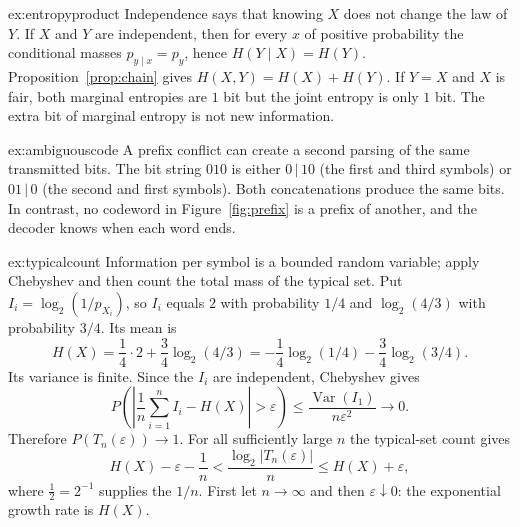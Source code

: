 \begin{solution}{ex:entropyproduct}
\idea Independence says that knowing $X$ does not change the law of $Y$.
\writeup If $X$ and $Y$ are independent, then for every $x$ of positive probability the conditional masses $p_{y\mid x}=p_y$, hence $H(Y\mid X)=H(Y)$. Proposition~\ref{prop:chain} gives $H(X,Y)=H(X)+H(Y)$. If $Y=X$ and $X$ is fair, both marginal entropies are $1$ bit but the joint entropy is only $1$ bit. The extra bit of marginal entropy is not new information.
\end{solution}

\begin{solution}{ex:ambiguouscode}
\idea A prefix conflict can create a second parsing of the same transmitted bits.
\writeup The bit string $010$ is either $0\,|\,10$ (the first and third symbols) or $01\,|\,0$ (the second and first symbols). Both concatenations produce the same bits. In contrast, no codeword in Figure~\ref{fig:prefix} is a prefix of another, and the decoder knows when each word ends.
\end{solution}

\begin{solution}{ex:typicalcount}
\idea Information per symbol is a bounded random variable; apply Chebyshev and then count the total mass of the typical set.
\writeup Put $I_i=\log_2(1/p_{X_i})$, so $I_i$ equals $2$ with probability $1/4$ and $\log_2(4/3)$ with probability $3/4$. Its mean is
\[
H(X)=\frac14\cdot2+\frac34\log_2(4/3)
= -\frac14\log_2(1/4)-\frac34\log_2(3/4).
\]
Its variance is finite. Since the $I_i$ are independent, Chebyshev gives
\[
 P\left(\left|\frac1n\sum_{i=1}^n I_i-H(X)\right|>\varepsilon\right)
 \le\frac{\operatorname{Var}(I_1)}{n\varepsilon^2}\longrightarrow0.
\]
Therefore $P(T_n(\varepsilon))\to1$. For all sufficiently large $n$ the typical-set count gives
\[
H(X)-\varepsilon-\frac1n
<\frac{\log_2|T_n(\varepsilon)|}{n}
\le H(X)+\varepsilon,
\]
where $\frac12=2^{-1}$ supplies the $1/n$. First let $n\to\infty$ and then $\varepsilon\downarrow0$: the exponential growth rate is $H(X)$.
\end{solution}


